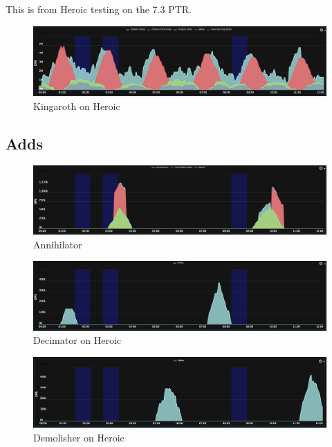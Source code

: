 \documentclass{article}
\begin{document}
This is from Heroic testing on the 7.3 PTR.

\begin{figure}[!htb]
  \includegraphics[width=\linewidth]{07-kingaroth.png}
  \caption{Kingaroth on Heroic}
  \label{fig:dmg7}
\end{figure}

\subsection{Adds}
\begin{figure}[!htb]
  \includegraphics[width=\linewidth]{07-kingaroth-annihilator.png}
  \caption{Annihilator}
  \label{fig:dmg7}
\end{figure}

\begin{figure}[!htb]
  \includegraphics[width=\linewidth]{07-kingaroth-decimator.png}
  \caption{Decimator on Heroic}
  \label{fig:dmg7}
\end{figure}

\begin{figure}[!htb]
  \includegraphics[width=\linewidth]{07-kingaroth-demolisher.png}
  \caption{Demolisher on Heroic}
  \label{fig:dmg7}
\end{figure}
\end{document}
